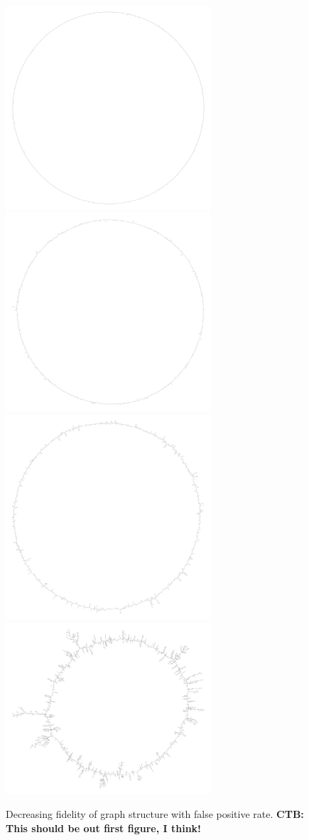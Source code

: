 \documentclass[12pt]{article} \usepackage{simplemargins}
\begin{document}
\begin{figure}
\includegraphics[width=3in]{figures/f3b001}
\includegraphics[width=3in]{figures/f3b005}\\
\includegraphics[width=3in]{figures/f3b010}
\includegraphics[width=3in]{figures/f3b015}
\caption{Decreasing fidelity of graph structure with false positive rate.
{\bf CTB: This should be out first figure, I think!}}
\end{figure}
\end{document}

